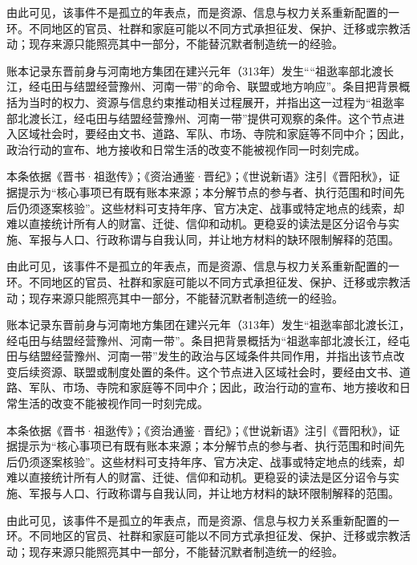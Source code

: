 由此可见，该事件不是孤立的年表点，而是资源、信息与权力关系重新配置的一环。不同地区的官员、社群和家庭可能以不同方式承担征发、保护、迁移或宗教活动；现存来源只能照亮其中一部分，不能替沉默者制造统一的经验。

账本记录东晋前身与河南地方集团在建兴元年（313年）发生““祖逖率部北渡长江，经屯田与结盟经营豫州、河南一带”的命令、联盟或地方响应”。条目把背景概括为当时的权力、资源与信息约束推动相关过程展开，并指出这一过程为“祖逖率部北渡长江，经屯田与结盟经营豫州、河南一带”提供可观察的条件。这个节点进入区域社会时，要经由文书、道路、军队、市场、寺院和家庭等不同中介；因此，政治行动的宣布、地方接收和日常生活的改变不能被视作同一时刻完成。

本条依据《晋书·祖逖传》；《资治通鉴·晋纪》；《世说新语》注引《晋阳秋》，证据提示为“核心事项已有既有账本来源；本分解节点的参与者、执行范围和时间先后仍须逐案核验”。这些材料可支持年序、官方决定、战事或特定地点的线索，却难以直接统计所有人的财富、迁徙、信仰和动机。更稳妥的读法是区分诏令与实施、军报与人口、行政称谓与自我认同，并让地方材料的缺环限制解释的范围。

由此可见，该事件不是孤立的年表点，而是资源、信息与权力关系重新配置的一环。不同地区的官员、社群和家庭可能以不同方式承担征发、保护、迁移或宗教活动；现存来源只能照亮其中一部分，不能替沉默者制造统一的经验。

账本记录东晋前身与河南地方集团在建兴元年（313年）发生“祖逖率部北渡长江，经屯田与结盟经营豫州、河南一带”。条目把背景概括为“祖逖率部北渡长江，经屯田与结盟经营豫州、河南一带”发生的政治与区域条件共同作用，并指出该节点改变后续资源、联盟或制度处置的条件。这个节点进入区域社会时，要经由文书、道路、军队、市场、寺院和家庭等不同中介；因此，政治行动的宣布、地方接收和日常生活的改变不能被视作同一时刻完成。

本条依据《晋书·祖逖传》；《资治通鉴·晋纪》；《世说新语》注引《晋阳秋》，证据提示为“核心事项已有既有账本来源；本分解节点的参与者、执行范围和时间先后仍须逐案核验”。这些材料可支持年序、官方决定、战事或特定地点的线索，却难以直接统计所有人的财富、迁徙、信仰和动机。更稳妥的读法是区分诏令与实施、军报与人口、行政称谓与自我认同，并让地方材料的缺环限制解释的范围。

由此可见，该事件不是孤立的年表点，而是资源、信息与权力关系重新配置的一环。不同地区的官员、社群和家庭可能以不同方式承担征发、保护、迁移或宗教活动；现存来源只能照亮其中一部分，不能替沉默者制造统一的经验。

